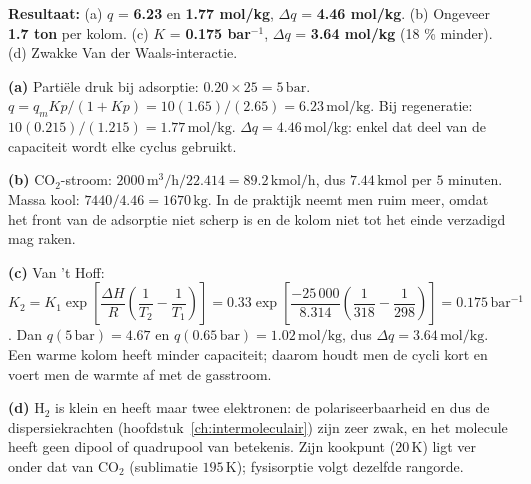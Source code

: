 \begin{oplossing}
\textbf{Resultaat:} (a) \(q\) = \textbf{6.23} en \textbf{1.77 mol/kg}, \(\Delta q\) = \textbf{4.46 mol/kg}. (b) Ongeveer \textbf{1.7 ton} per kolom. (c) \(K\) = \textbf{0.175 bar\ensuremath{^{-1}}}, \(\Delta q\) = \textbf{3.64 mol/kg} (18 \% minder). (d) Zwakke Van der Waals-interactie.

\textbf{(a)} Partiële druk bij adsorptie: \(0.20 \times 25 = 5\,\mathrm{bar}\). \(q = q_m Kp/(1+Kp) = 10(1.65)/(2.65) = 6.23\,\mathrm{mol/kg}\). Bij regeneratie: \(10(0.215)/(1.215) = 1.77\,\mathrm{mol/kg}\). \(\Delta q = 4.46\,\mathrm{mol/kg}\): enkel dat deel van de capaciteit wordt elke cyclus gebruikt.

\textbf{(b)} CO\(_2\)-stroom: \(2000\,\mathrm{m^3/h}/22.414 = 89.2\,\mathrm{kmol/h}\), dus \(7.44\,\mathrm{kmol}\) per \(5\) minuten. Massa kool: \(7440/4.46 = 1670\,\mathrm{kg}\). In de praktijk neemt men ruim meer, omdat het front van de adsorptie niet scherp is en de kolom niet tot het einde verzadigd mag raken.

\textbf{(c)} Van 't Hoff: \(K_2 = K_1\exp\!\left[\dfrac{\Delta H}{R}\left(\dfrac{1}{T_2}-\dfrac{1}{T_1}\right)\right] = 0.33\exp\!\left[\dfrac{-25\,000}{8.314}\left(\dfrac{1}{318}-\dfrac{1}{298}\right)\right] = 0.175\,\mathrm{bar^{-1}}\). Dan \(q(5\,\mathrm{bar}) = 4.67\) en \(q(0.65\,\mathrm{bar}) = 1.02\,\mathrm{mol/kg}\), dus \(\Delta q = 3.64\,\mathrm{mol/kg}\). Een warme kolom heeft minder capaciteit; daarom houdt men de cycli kort en voert men de warmte af met de gasstroom.

\textbf{(d)} H\(_2\) is klein en heeft maar twee elektronen: de polariseerbaarheid en dus de dispersiekrachten (hoofdstuk~\ref{ch:intermoleculair}) zijn zeer zwak, en het molecule heeft geen dipool of quadrupool van betekenis. Zijn kookpunt (\(20\,\mathrm{K}\)) ligt ver onder dat van CO\(_2\) (sublimatie \(195\,\mathrm{K}\)); fysisorptie volgt dezelfde rangorde.
\end{oplossing}

